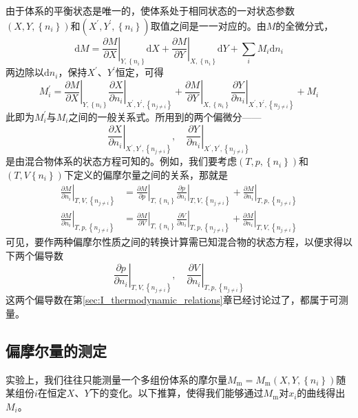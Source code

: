 \documentclass[main.tex]{subfiles}
\begin{document}
由于体系的平衡状态是唯一的，使体系处于相同状态的一对状态参数$\left(X,Y,\left\{n_i\right\}\right)$和$\left(X^\prime,Y^\prime,\left\{n_i\right\}\right)$取值之间是一一对应的。由$M$的全微分式，
\[\mathrm{d}M=\left.\frac{\partial M}{\partial X}\right|_{Y,\left\{n_i\right\}}\mathrm{d}X+\left.\frac{\partial M}{\partial Y}\right|_{X,\left\{n_i\right\}}\mathrm{d}Y+\sum_i M_i\mathrm{d}n_i\]
两边除以$\mathrm{d}n_i$，保持$X^\prime$、$Y^\prime$恒定，可得
\[M_i^\prime=\left.\frac{\partial M}{\partial X}\right|_{Y,\left\{n_i\right\}}\left.\frac{\partial X}{\partial n_i}\right|_{X^\prime,Y^\prime,\left\{n_{j\neq i}\right\}}+\left.\frac{\partial M}{\partial Y}\right|_{X,\left\{n_i\right\}}\left.\frac{\partial Y}{\partial n_i}\right|_{X^\prime,Y^\prime,\left\{n_{j\neq i}\right\}}+M_i\]
此即为$M_i^\prime$与$M_i$之间的一般关系式。所用到的两个偏微分——
\[\left.\frac{\partial X}{\partial n_i}\right|_{X^\prime,Y^\prime,\left\{n_{j\neq i}\right\}},\quad\left.\frac{\partial Y}{\partial n_i}\right|_{X^\prime,Y^\prime,\left\{n_{j\neq i}\right\}}\]
是由混合物体系的状态方程可知的。例如，我们要考虑$\left(T,p,\left\{n_i\right\}\right)$和$\left(T,V\left\{n_i\right\}\right)$下定义的偏摩尔量之间的关系，那就是
\begin{align*}
    \left.\frac{\partial M}{\partial n_i}\right|_{T,V,\left\{n_{j\neq i}\right\}} & =\left.\frac{\partial M}{\partial p}\right|_{T,\left\{n_i\right\}}\left.\frac{\partial p}{\partial n_i}\right|_{T,V,\left\{n_{j\neq i}\right\}}+\left.\frac{\partial M}{\partial n_i}\right|_{T,p,\left\{n_{j\neq i}\right\}} \\
    \left.\frac{\partial M}{\partial n_i}\right|_{T,p,\left\{n_{j\neq i}\right\}} & =\left.\frac{\partial M}{\partial V}\right|_{T,\left\{n_i\right\}}\left.\frac{\partial V}{\partial n_i}\right|_{T,p,\left\{n_{j\neq i}\right\}}+\left.\frac{\partial M}{\partial n_i}\right|_{T,V,\left\{n_{j\neq i}\right\}}
\end{align*}
可见，要作两种偏摩尔性质之间的转换计算需已知混合物的状态方程，以便求得以下两个偏导数
\[\left.\frac{\partial p}{\partial n_i}\right|_{T,V,\left\{n_{j\neq i}\right\}},\quad\left.\frac{\partial V}{\partial n_i}\right|_{T,p,\left\{n_{j\neq i}\right\}}\]
这两个偏导数在第\ref{sec:I_thermodynamic_relations}章已经讨论过了，都属于可测量。

\subsection{偏摩尔量的测定}
实验上，我们往往只能测量一个多组份体系的摩尔量$M_\text{m}=M_\text{m}\left(X,Y,\left\{n_i\right\}\right)$随某组份$i$在恒定$X$、$Y$下的变化。以下推算，使得我们能够通过$M_\text{m}$对$x_i$的曲线得出$M_i$。
\end{document}
